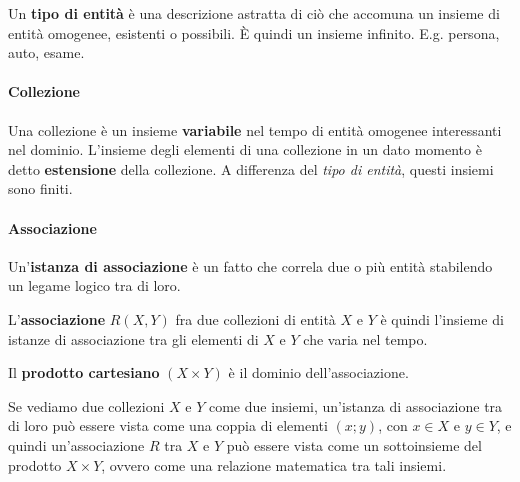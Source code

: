 Un \textbf{tipo di entità} è una descrizione astratta di ciò che accomuna un insieme di entità omogenee, esistenti o possibili. È quindi un insieme infinito. E.g. persona, auto, esame.

\paragraph{Collezione}
Una collezione è un insieme \textbf{variabile} nel tempo di entità omogenee interessanti nel dominio. L'insieme degli elementi di una collezione in un dato momento è detto \textbf{estensione} della collezione. A differenza del \textit{tipo di entità}, questi insiemi sono finiti.

\paragraph{Associazione}

\begin{definition}
	Un'\textbf{istanza di associazione} è un fatto che correla due o più entità stabilendo un legame logico tra di loro. 
\end{definition}

\begin{definition}[Associazione]
	L'\textbf{associazione} $R(X,Y)$ fra due collezioni di entità $X$ e $Y$ è quindi l'insieme di istanze di associazione tra gli elementi di $X$ e $Y$ che varia nel tempo.
\end{definition}

\begin{definition}
	Il \textbf{prodotto cartesiano} $(X \times Y)$ è il dominio dell'associazione.
\end{definition}

\begin{observation}
	Se vediamo due collezioni $X$ e $Y$ come due insiemi, un’istanza di associazione tra di loro può essere vista come una coppia di elementi $(x; y)$, con $x \in X$ e $y\in Y$, e quindi un’associazione $R$ tra $X$ e $Y$ può essere vista come un sottoinsieme del prodotto $X \times Y$, ovvero come	una relazione matematica tra tali insiemi.
\end{observation}

